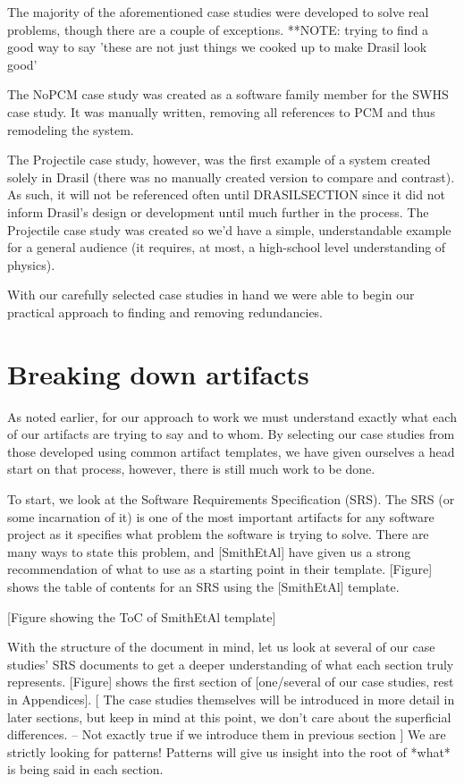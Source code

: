 The majority of the aforementioned case studies were developed to solve real
problems, though there are a couple of exceptions.
  **NOTE: trying to find a good way to say 'these are not just things we cooked
    up to make Drasil look good'
    
The NoPCM case study was created as a software family member for the SWHS case
study. It was manually written, removing all references to PCM and thus 
remodeling the system.

The Projectile case study, however, was the first example of a system created
solely in Drasil (there was no manually created version to compare and 
contrast). As such, it will not be referenced often until DRASILSECTION since
it did not inform Drasil's design or development until much further in the 
process. The Projectile case study was created so we'd have a simple, 
understandable example for a general audience (it requires, at most, a 
high-school level understanding of physics). 

With our carefully selected case studies in hand we were able to begin our 
practical approach to finding and removing redundancies.

\section{Breaking down artifacts}
As noted earlier, for our approach to work we must understand exactly what each
of our artifacts are trying to say and to whom. By selecting our case studies 
from those developed using common artifact templates, we have given ourselves a
head start on that process, however, there is still much work to be done.

To start, we look at the Software Requirements Specification (SRS). The SRS
(or some incarnation of it) is one of the most important artifacts for any
software project as it specifies what problem the software is trying to solve.
There are many ways to state this problem, and [SmithEtAl] have given us a
strong recommendation of what to use as a starting point in their template.
[Figure] shows the table of contents for an SRS using the [SmithEtAl] template.

[Figure showing the ToC of SmithEtAl template]

With the structure of the document in mind, let us look at several of our case
studies' SRS documents to get a deeper understanding of what each section truly
represents. [Figure] shows the first section of [one/several of our case studies, rest in Appendices].
[ The case studies themselves will be introduced in more detail in later sections, but
keep in mind at this point, we don't care about the superficial differences. -- Not exactly true if we introduce them in previous section ]
 We are strictly looking for patterns! Patterns will give us insight
into the root of *what* is being said in each section.

